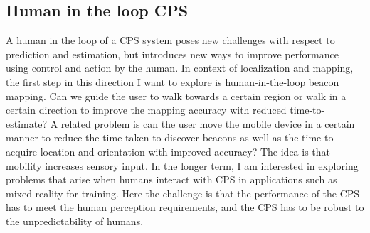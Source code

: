 \documentclass[10pt]{article}
\begin{document}
\subsection{Human in the loop CPS}
A human in the loop of a CPS system poses new challenges with respect to prediction and estimation, but introduces new ways to improve performance using control and action by the human. In context of localization and mapping, the first step in this direction I want to explore is human-in-the-loop beacon mapping. Can we guide the user to walk towards a certain region or walk in a certain direction to improve the mapping accuracy with reduced time-to-estimate? A related problem is can the user move the mobile device in a certain manner to reduce the time taken to discover beacons as well as the time to acquire location and orientation with improved accuracy? The idea is that mobility increases sensory input. In the longer term, I am interested in exploring problems that arise when humans interact with CPS in applications such as mixed reality for training. Here the challenge is that the performance of the CPS has to meet the human perception requirements, and the CPS has to be robust to the unpredictability of humans. 
\end{document}
